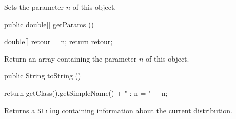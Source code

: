  \begin{tabb} Sets the parameter $n$ of this object.
 \end{tabb}
 \begin{code}

   public double[] getParams ()\begin{hide} {
      double[] retour = {n};
      return retour;
   }\end{hide}
\end{code}
\begin{tabb}
   Return an array containing the parameter $n$ of this object.
\end{tabb}
\begin{hide}\begin{code}

   public String toString ()\begin{hide} {
      return getClass().getSimpleName() + " : n = " + n;
   }\end{hide}
\end{code}
\begin{tabb}
   Returns a \texttt{String} containing information about the current distribution.
\end{tabb}\end{hide}
\begin{code}\begin{hide}
}\end{hide}
\end{code}
